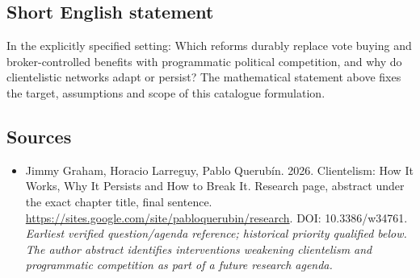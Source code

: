 \documentclass[11pt]{article}
\begin{document}
\subsection{Short English statement}
In the explicitly specified setting: Which reforms durably replace vote buying and broker-controlled benefits with programmatic political competition, and why do clientelistic networks adapt or persist? The mathematical statement above fixes the target, assumptions and scope of this catalogue formulation.

\subsection{Sources}
\begin{itemize}\raggedright
\item[\textnormal{[S1]}]\hypertarget{source:30007666:1}{} Jimmy Graham, Horacio Larreguy, Pablo Querubín. 2026. Clientelism: How It Works, Why It Persists and How to Break It. Research page, abstract under the exact chapter title, final sentence.
\url{https://sites.google.com/site/pabloquerubin/research}.
DOI: 10.3386/w34761.
{\small\textit{Earliest verified question/agenda reference; historical priority qualified below. The author abstract identifies interventions weakening clientelism and programmatic competition as part of a future research agenda.}}
\end{itemize}
\end{document}
